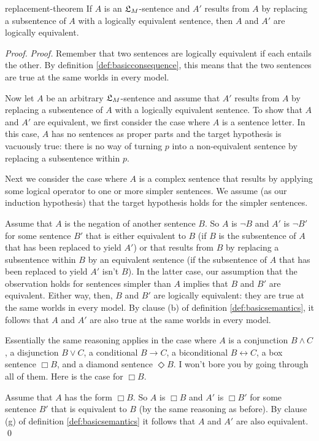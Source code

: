 \begin{observation}{replacement-theorem}
  If $A$ is an $\mathfrak{L}_{M}$-sentence and $A'$ results from $A$ by replacing a
  subsentence of $A$ with a logically equivalent sentence, then $A$ and $A'$ are
  logically equivalent.
\end{observation}
\begin{proof}
  \emph{Proof.} Remember that two sentences are logically equivalent if each
  entails the other. By definition \ref{def:basicconsequence}, this means that
  the two sentences are true at the same worlds in every model.

  Now let $A$ be an arbitrary $\mathfrak{L}_{M}$-sentence and assume that $A'$ results
  from $A$ by replacing a subsentence of $A$ with a logically equivalent
  sentence. To show that $A$ and $A'$ are equivalent, we first consider the case
  where $A$ is a sentence letter. In this case, $A$ has no sentences as proper
  parts and the target hypothesis is vacuously true: there is no way of turning
  $p$ into a non-equivalent sentence by replacing a subsentence within $p$.

  Next we consider the case where $A$ is a complex sentence that results by
  applying some logical operator to one or more simpler sentences. We assume (as
  our induction hypothesis) that the target hypothesis holds for the simpler
  sentences.

  Assume that $A$ is the negation of another sentence $B$. So $A$ is $\neg B$
  and $A'$ is $\neg B'$ for some sentence $B'$ that is either equivalent to $B$
  (if $B$ is the subsentence of $A$ that has been replaced to yield $A'$) or
  that results from $B$ by replacing a subsentence within $B$ by an equivalent
  sentence (if the subsentence of $A$ that has been replaced to yield $A'$ isn't
  $B$). In the latter case, our assumption that the observation holds for
  sentences simpler than $A$ implies that $B$ and $B'$ are equivalent. Either
  way, then, $B$ and $B'$ are logically equivalent: they are true at the same
  worlds in every model. By clause (b) of definition \ref{def:basicsemantics},
  it follows that $A$ and $A'$ are also true at the same worlds in every model.

  Essentially the same reasoning applies in the case where $A$ is a conjunction
  $B \land C$, a disjunction $B \lor C$, a conditional $B \to C$, a
  biconditional $B \leftrightarrow C$, a box sentence $\Box B$, and a diamond
  sentence $\Diamond B$. I won't bore you by going through all of them. Here is
  the case for $\Box B$.
  
  Assume that $A$ has the form $\Box B$. So $A$ is $\Box B$ and $A'$ is
  $\Box B'$ for some sentence $B'$ that is equivalent to $B$ (by the same
  reasoning as before). By clause (g) of definition \ref{def:basicsemantics} it
  follows that $A$ and $A'$ are also equivalent. \qed

\end{proof}



